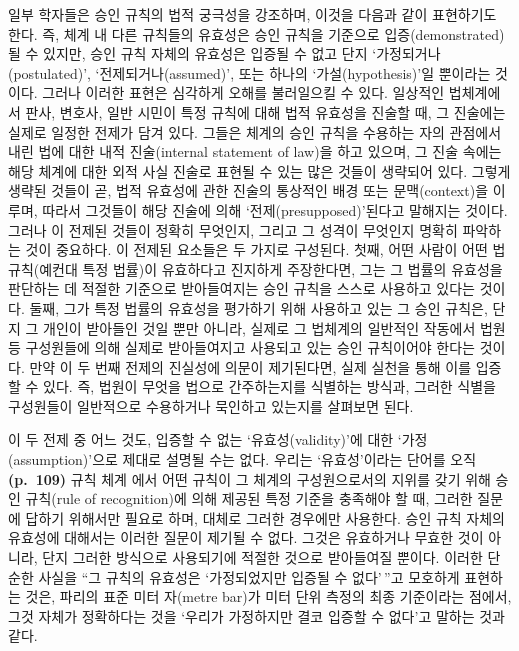 일부 학자들은 승인 규칙의 법적 궁극성을 강조하며, 이것을 다음과 같이
표현하기도 한다. 즉, 체계 내 다른 규칙들의 유효성은 승인 규칙을 기준으로
입증(demonstrated)될 수 있지만, 승인 규칙 자체의 유효성은 입증될 수 없고
단지 `가정되거나(postulated)', `전제되거나(assumed)', 또는 하나의
`가설(hypothesis)'일 뿐이라는 것이다. 그러나 이러한 표현은 심각하게
오해를 불러일으킬 수 있다. 일상적인 법체계에서 판사, 변호사, 일반 시민이
특정 규칙에 대해 법적 유효성을 진술할 때, 그 진술에는 실제로 일정한
전제가 담겨 있다. 그들은 체계의 승인 규칙을 수용하는 자의 관점에서 내린
법에 대한 내적 진술(internal statement of law)을 하고 있으며, 그 진술
속에는 해당 체계에 대한 외적 사실 진술로 표현될 수 있는 많은 것들이
생략되어 있다. 그렇게 생략된 것들이 곧, 법적 유효성에 관한 진술의
통상적인 배경 또는 문맥(context)을 이루며, 따라서 그것들이 해당 진술에
의해 `전제(presupposed)'된다고 말해지는 것이다. 그러나 이 전제된 것들이
정확히 무엇인지, 그리고 그 성격이 무엇인지 명확히 파악하는 것이
중요하다. 이 전제된 요소들은 두 가지로 구성된다. 첫째, 어떤 사람이 어떤
법 규칙(예컨대 특정 법률)이 유효하다고 진지하게 주장한다면, 그는 그
법률의 유효성을 판단하는 데 적절한 기준으로 받아들여지는 승인 규칙을
스스로 사용하고 있다는 것이다. 둘째, 그가 특정 법률의 유효성을 평가하기
위해 사용하고 있는 그 승인 규칙은, 단지 그 개인이 받아들인 것일 뿐만
아니라, 실제로 그 법체계의 일반적인 작동에서 법원 등 구성원들에 의해
실제로 받아들여지고 사용되고 있는 승인 규칙이어야 한다는 것이다. 만약 이
두 번째 전제의 진실성에 의문이 제기된다면, 실제 실천을 통해 이를 입증할
수 있다. 즉, 법원이 무엇을 법으로 간주하는지를 식별하는 방식과, 그러한
식별을 구성원들이 일반적으로 수용하거나 묵인하고 있는지를 살펴보면 된다.

이 두 전제 중 어느 것도, 입증할 수 없는 `유효성(validity)'에 대한
`가정(assumption)'으로 제대로 설명될 수는 없다. 우리는 `유효성'이라는
단어를 오직 \textbf{(p.~109)} 규칙 체계  에서 어떤
규칙이 그 체계의 구성원으로서의 지위를 갖기 위해 승인 규칙(rule of
recognition)에 의해 제공된 특정 기준을 충족해야 할 때, 그러한 질문에
답하기 위해서만 필요로 하며, 대체로 그러한 경우에만 사용한다. 승인 규칙
자체의 유효성에 대해서는 이러한 질문이 제기될 수 없다. 그것은 유효하거나
무효한 것이 아니라, 단지 그러한 방식으로 사용되기에 적절한 것으로
받아들여질 뿐이다. 이러한 단순한 사실을 ``그 규칙의 유효성은
`가정되었지만 입증될 수 없다'\,''고 모호하게 표현하는 것은, 파리의 표준
미터 자(metre bar)가 미터 단위 측정의 최종 기준이라는 점에서, 그것
자체가 정확하다는 것을 `우리가 가정하지만 결코 입증할 수 없다'고 말하는
것과 같다.

